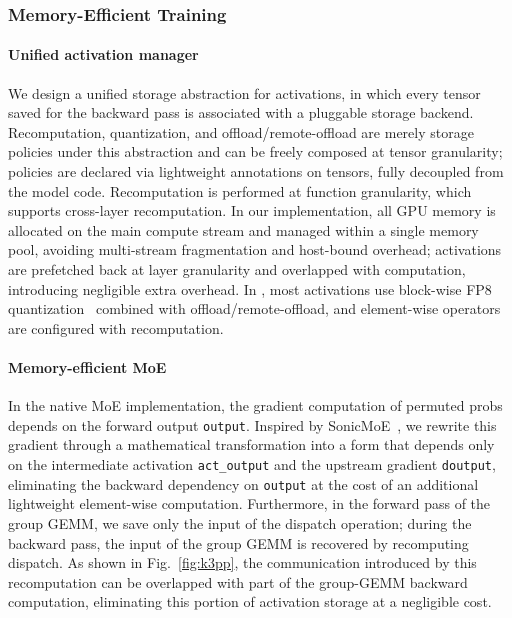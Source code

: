 \subsubsection{Memory-Efficient Training}
\label{sec:memory-efficient-training}

\paragraph{Unified activation manager}
We design a unified storage abstraction for activations, in which every tensor saved for the backward pass is associated with a pluggable storage backend.
Recomputation, quantization, and offload/remote-offload are merely storage policies under this abstraction and can be freely composed at tensor granularity; policies are declared via lightweight annotations on tensors, fully decoupled from the model code.
Recomputation is performed at function granularity, which supports cross-layer recomputation.
In our implementation, all GPU memory is allocated on the main compute stream and managed within a single memory pool, avoiding multi-stream fragmentation and host-bound overhead; activations are prefetched back at layer granularity and overlapped with computation, introducing negligible extra overhead.
In , most activations use block-wise FP8 quantization~\citep{kimiteam2025kimik2openagentic, deepseekaiv3} combined with offload/remote-offload, and element-wise operators are configured with recomputation.

\paragraph{Memory-efficient MoE}
In the native MoE implementation, the gradient computation of permuted probs depends on the forward output \texttt{output}.
Inspired by SonicMoE~\citep{guo2025sonicmoeacceleratingmoeio}, we rewrite this gradient through a mathematical transformation into a form that depends only on the intermediate activation \texttt{act\_output} and the upstream gradient \texttt{doutput}, eliminating the backward dependency on \texttt{output} at the cost of an additional lightweight element-wise computation.
Furthermore, in the forward pass of the group GEMM, we save only the input of the dispatch operation; during the backward pass, the input of the group GEMM is recovered by recomputing dispatch.
As shown in Fig.~\ref{fig:k3pp}, the communication introduced by this recomputation can be overlapped with part of the group-GEMM backward computation, eliminating this portion of activation storage at a negligible cost.

